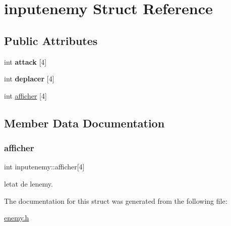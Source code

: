\hypertarget{structinputenemy}{}\section{inputenemy Struct Reference}
\label{structinputenemy}
\subsection*{Public Attributes}
\begin{DoxyCompactItemize}
\item 
\mbox{\label{structinputenemy_af8e763ee02b7ce6926df774d8fceb858}} 
int {\bfseries attack} \mbox{[}4\mbox{]}
\item 
\mbox{\label{structinputenemy_ad87979910dc9ba6e8901cbbec5085268}} 
int {\bfseries deplacer} \mbox{[}4\mbox{]}
\item 
int \hyperlink{structinputenemy_a8c04020d4d29dc07b9d17a375511dba2}{afficher} \mbox{[}4\mbox{]}
\end{DoxyCompactItemize}


\subsection{Member Data Documentation}
\mbox{\label{structinputenemy_a8c04020d4d29dc07b9d17a375511dba2}} 
\subsubsection{\texorpdfstring{afficher}{afficher}}
{\footnotesize\ttfamily int inputenemy\+::afficher\mbox{[}4\mbox{]}}

l\textquotesingle{}etat de l\textquotesingle{}enemy. 

The documentation for this struct was generated from the following file\+:\begin{DoxyCompactItemize}
\item 
\hyperlink{enemy_8h}{enemy.\+h}\end{DoxyCompactItemize}
